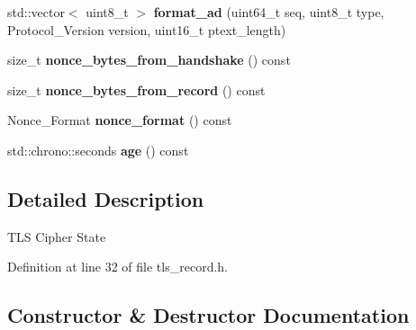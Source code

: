 \begin{DoxyCompactItemize}
std\+::vector$<$ uint8\+\_\+t $>$ {\bfseries format\+\_\+ad} (uint64\+\_\+t seq, uint8\+\_\+t type, Protocol\+\_\+\+Version version, uint16\+\_\+t ptext\+\_\+length)
\item 
\mbox{\label{class_botan_1_1_t_l_s_1_1_connection___cipher___state_a5f7161f30a3308bfd21ac440efc74ea9}} 
size\+\_\+t {\bfseries nonce\+\_\+bytes\+\_\+from\+\_\+handshake} () const
\item 
\mbox{\label{class_botan_1_1_t_l_s_1_1_connection___cipher___state_a5443993a20a782d907edae616eab5e2c}} 
size\+\_\+t {\bfseries nonce\+\_\+bytes\+\_\+from\+\_\+record} () const
\item 
\mbox{\label{class_botan_1_1_t_l_s_1_1_connection___cipher___state_a5cfb9c8c03db0d2d6969350cd0003807}} 
Nonce\+\_\+\+Format {\bfseries nonce\+\_\+format} () const
\item 
\mbox{\label{class_botan_1_1_t_l_s_1_1_connection___cipher___state_a1695503bd69f23dadfe5b2723e6c4431}} 
std\+::chrono\+::seconds {\bfseries age} () const
\end{DoxyCompactItemize}


\subsection{Detailed Description}
T\+LS Cipher State 

Definition at line 32 of file tls\+\_\+record.\+h.



\subsection{Constructor \& Destructor Documentation}
\mbox{\label{class_botan_1_1_t_l_s_1_1_connection___cipher___state_a7cac46fbec016d6a6eff0610dc147f85}} 

